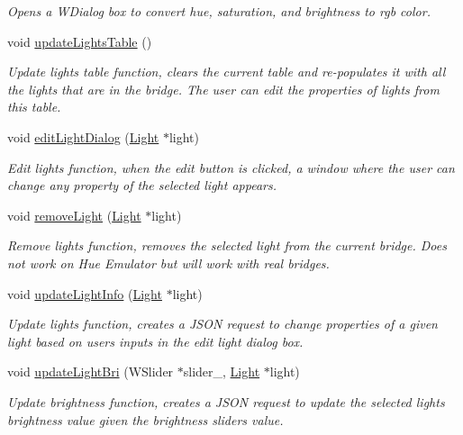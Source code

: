 \begin{DoxyCompactItemize}
\begin{DoxyCompactList}\small\item\em Opens a W\+Dialog box to convert hue, saturation, and brightness to rgb color. \end{DoxyCompactList}\item 
void \hyperlink{classLightManagementWidget_a80e917263bea4c99ca9182fb57ce0993}{update\+Lights\+Table} ()
\begin{DoxyCompactList}\small\item\em Update lights table function, clears the current table and re-\/populates it with all the lights that are in the bridge. The user can edit the properties of lights from this table. \end{DoxyCompactList}\item 
void \hyperlink{classLightManagementWidget_ae6de54d491c808a6a85ab9b01be3382b}{edit\+Light\+Dialog} (\hyperlink{classLight}{Light} $\ast$light)
\begin{DoxyCompactList}\small\item\em Edit lights function, when the edit button is clicked, a window where the user can change any property of the selected light appears. \end{DoxyCompactList}\item 
void \hyperlink{classLightManagementWidget_afc4ccdbe0e7fe288e3a76284c304be6f}{remove\+Light} (\hyperlink{classLight}{Light} $\ast$light)
\begin{DoxyCompactList}\small\item\em Remove lights function, removes the selected light from the current bridge. Does not work on Hue Emulator but will work with real bridges. \end{DoxyCompactList}\item 
void \hyperlink{classLightManagementWidget_a9455da3d378d78c2840eafa04ea37294}{update\+Light\+Info} (\hyperlink{classLight}{Light} $\ast$light)
\begin{DoxyCompactList}\small\item\em Update lights function, creates a J\+S\+ON request to change properties of a given light based on user\textquotesingle{}s inputs in the edit light dialog box. \end{DoxyCompactList}\item 
void \hyperlink{classLightManagementWidget_a147fb03b68b3caf8744d10c78b26caff}{update\+Light\+Bri} (W\+Slider $\ast$slider\+\_\+, \hyperlink{classLight}{Light} $\ast$light)
\begin{DoxyCompactList}\small\item\em Update brightness function, creates a J\+S\+ON request to update the selected light\textquotesingle{}s brightness value given the brightness slider\textquotesingle{}s value. \end{DoxyCompactList}\item 

\end{DoxyCompactItemize}
